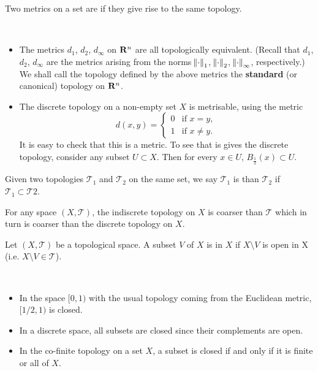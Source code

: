 \begin{definition}
Two metrics on a set are  if they give rise to the same topology.
\end{definition}

\begin{example} \
\begin{itemize}
\item The metrics $d_1$, $d_2$, $d_\infty$ on $\mathbf R^n$ are all topologically equivalent. (Recall that $d_1$, $d_2$, $d_\infty$ are the metrics arising from the norms $\norm{\cdot}_1$, $\norm{\cdot}_2$, $\norm{\cdot}_\infty$, respectively.)
We shall call the topology defined by the above metrics the \textbf{standard} (or canonical) topology on $\mathbf R^n$.
\item The discrete topology on a non-empty set $X$ is metrisable, using the metric
\[d(x,y)=\begin{cases}
0&\text{if }x=y,\\
1&\text{if }x\neq y.
\end{cases}\]
It is easy to check that this is a metric. To see that is gives the discrete topology, consider any subset $U\subset X$. Then for every $x\in U$, $B_\frac{1}{2}(x)\subset U$.
\end{itemize}
\end{example}

\begin{definition}
Given two topologies $\mathcal{T}_1$ and $\mathcal{T}_2$ on the same set, we say $\mathcal{T}_1$ is  than $\mathcal{T}_2$ if $\mathcal{T}_1\subset\mathcal{T}2$.
\end{definition}

\begin{remark}
For any space $(X,\mathcal{T})$, the indiscrete topology on $X$ is coarser than $\mathcal{T}$ which in turn is coarser than the discrete topology on $X$.
\end{remark}

\begin{definition}
Let $(X,\mathcal{T})$ be a topological space. A subset $V$ of $X$ is  in $X$ if $X\setminus V$ is open in X (i.e. $X\setminus V\in\mathcal{T}$).
\end{definition}

\begin{example} \
\begin{itemize}
\item In the space $[0,1)$ with the usual topology coming from the Euclidean metric, $[1/2,1)$ is closed.
\item In a discrete space, all subsets are closed since their complements are open.
\item In the co-finite topology on a set $X$, a subset is closed if and only if it is finite or all of $X$.
\end{itemize}
\end{example}

